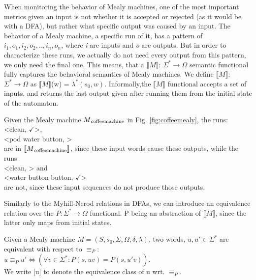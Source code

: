 When monitoring the behavior of Mealy machines, one of the most important metrics given an input is not whether it is accepted or rejected (as it would be with a DFA), but rather what specific output was caused by an input. The behavior of a Mealy machine, a specific run of it, has a pattern of \textit{$i_1,o_1,i_2,o_2,..,i_n,o_n$}, where \textit{i} are inputs and \textit{o} are outputs. But in order to characterize these runs, we actually do not need every output from this pattern, we only need the final one. This means, that a $\llbracket M\rrbracket$: $\Sigma^*\to\Omega$ semantic functional fully captures the behavioral semantics of Mealy machines. We define $\llbracket M\rrbracket$: $\Sigma^*\to\Omega$ as  $\llbracket M\rrbracket$(w) = $\lambda^*(s_0, w)$. Informally,the  $\llbracket M\rrbracket$ functional accepts a set of inputs, and returns the last output given after running them from the initial state of the automaton. 

\begin{example}
	Given the Mealy machine $M\textsubscript{coffeemachine}$ in Fig. \ref{fig:coffeemealy}, the runs:\\
	\null\qquad<clean, $\checkmark$>, \\
	\null\qquad<pod water button, \Coffeecup> \\
	are in $\llbracket M\textsubscript{coffeemachine}\rrbracket$, since these input words cause these outputs, while the runs\\
	\null\qquad<clean, \Coffeecup> and \\
	\null\qquad<water button button, $\checkmark$> \\
	are not, since these input sequences do not produce those outputs.
\end{example}

Similarly to the Myhill-Nerod relations in DFAs, we can introduce an equivalence relation over the $P: \Sigma^*\to\Omega$ functional. P being an abstraction of $\llbracket M\rrbracket$, since the latter only maps from initial states.

\begin{definition}
	Given a Mealy machine $M=(S,s_{0},\Sigma,\Omega,\delta,\lambda) $, two words, $u, u'\in\Sigma^*$ are equivalent with respect to $\equiv_P$:\\
	$u \equiv_P u' \iff (\forall v\in\Sigma^*:P(s, uv) = P(s, u'v))$.\\
	We write [u] to denote the equivalence class of u wrt. $\equiv_P$.
\end{definition}

